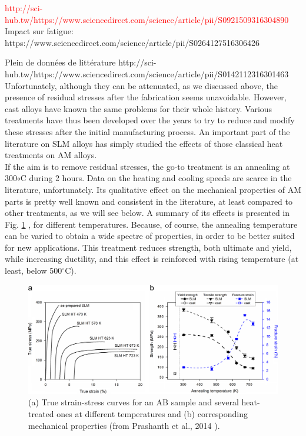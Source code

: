 \textcolor{red}{http://sci-hub.tw/https://www.sciencedirect.com/science/article/pii/S0921509316304890}\\

Impact sur fatigue:
https://www.sciencedirect.com/science/article/pii/S0264127516306426

Plein de données de littérature
http://sci-hub.tw/https://www.sciencedirect.com/science/article/pii/S0142112316301463 \\

Unfortunately, although they can be attenuated, as we discussed above, the presence of residual stresses after the fabrication seems unavoidable. However, cast alloys have known the same problems for their whole history. Various treatments have thus been developed over the years to try to reduce and modify these stresses after the initial manufacturing process. An important part of the literature on SLM alloys has simply studied the effects of those classical heat treatments on AM alloys.\\

If the aim is to remove residual stresses, the go-to treatment is an annealing at 300$\circ$C during 2 hours. Data on the heating and cooling speeds are scarce in the literature, unfortunately. Its qualitative effect on the mechanical properties of AM parts is pretty well known and consistent in the literature, at least compared to other treatments, as we will see below. A summary of its effects is presented in Fig. \ref{fig:mech_annealing} \cite{PRASHANTH14}, for different temperatures. Because, of course, the annealing temperature can be varied to obtain a wide spectre of properties, in order to be better suited for new applications. This treatment reduces strength, both ultimate and yield, while increasing ductility, and this effect is reinforced with rising temperature (at least, below 500$^\circ$C). \\

\begin{figure}[ht]
	\centering
	\includegraphics[scale=0.30]{Images/mech_annealing}
	\decoRule
	\caption[Principal residual stresses as a function of the depth relative to the surface. Sample B is built onto an undefined hollow support, while A is not]{(a) True strain-stress curves for an AB sample and several heat-treated ones at different temperatures and (b) corresponding mechanical properties (from Prashanth et al., 2014 \parencite{PRASHANTH14}).}
	\label{fig:mech_annealing}
\end{figure}

